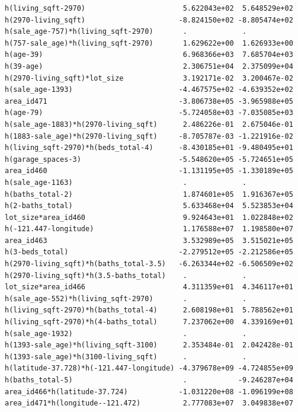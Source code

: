 \documentclass[
]{article}
\begin{document}
\begin{verbatim}
h(living_sqft-2970)                       5.622043e+02  5.648529e+02
h(2970-living_sqft)                      -8.824150e+02 -8.805474e+02
h(sale_age-757)*h(living_sqft-2970)       .             .           
h(757-sale_age)*h(living_sqft-2970)       1.629622e+00  1.626933e+00
h(age-39)                                 6.968366e+03  7.685704e+03
h(39-age)                                 2.306751e+04  2.375099e+04
h(2970-living_sqft)*lot_size              3.192171e-02  3.200467e-02
h(sale_age-1393)                         -4.467575e+02 -4.639352e+02
area_id471                               -3.806738e+05 -3.965988e+05
h(age-79)                                -5.724058e+03 -7.035085e+03
h(sale_age-1883)*h(2970-living_sqft)      2.486226e-01  2.675046e-01
h(1883-sale_age)*h(2970-living_sqft)     -8.705787e-03 -1.221916e-02
h(living_sqft-2970)*h(beds_total-4)      -8.430185e+01 -9.480495e+01
h(garage_spaces-3)                       -5.548620e+05 -5.724651e+05
area_id460                               -1.131195e+05 -1.330189e+05
h(sale_age-1163)                          .             .           
h(baths_total-2)                          1.874601e+05  1.916367e+05
h(2-baths_total)                          5.633468e+04  5.523853e+04
lot_size*area_id460                       9.924643e+01  1.022848e+02
h(-121.447-longitude)                     1.176588e+07  1.198580e+07
area_id463                                3.532989e+05  3.515021e+05
h(3-beds_total)                          -2.279512e+05 -2.212586e+05
h(2970-living_sqft)*h(baths_total-3.5)   -6.263344e+02 -6.506509e+02
h(2970-living_sqft)*h(3.5-baths_total)    .             .           
lot_size*area_id466                       4.311359e+01  4.346117e+01
h(sale_age-552)*h(living_sqft-2970)       .             .           
h(living_sqft-2970)*h(baths_total-4)      2.608198e+01  5.788562e+01
h(living_sqft-2970)*h(4-baths_total)      7.237062e+00  4.339169e+01
h(sale_age-1932)                          .             .           
h(1393-sale_age)*h(living_sqft-3100)      2.353484e-01  2.042428e-01
h(1393-sale_age)*h(3100-living_sqft)      .             .           
h(latitude-37.728)*h(-121.447-longitude) -4.379678e+09 -4.724855e+09
h(baths_total-5)                          .            -9.246287e+04
area_id466*h(latitude-37.724)            -1.031220e+08 -1.096199e+08
area_id471*h(longitude--121.472)          2.777083e+07  3.049838e+07
                                                                    

\end{verbatim}
\end{document}
